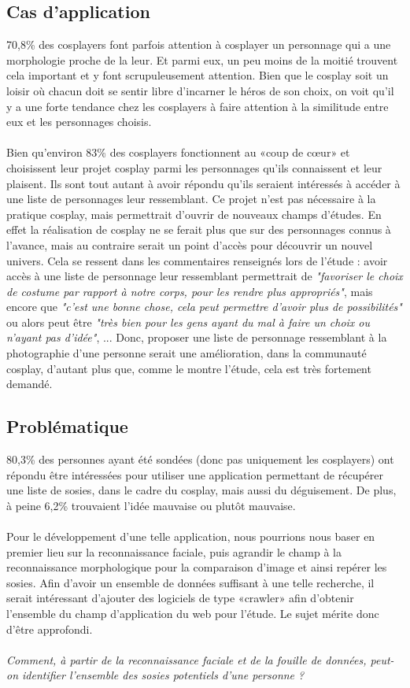 \documentclass[a4paper,12pt]{article}
\begin{document}
\subsection{Cas d'application}
70,8\% des cosplayers font parfois attention à cosplayer un personnage qui a une morphologie proche de la leur. Et parmi eux, un peu moins de la moitié trouvent cela important et y font scrupuleusement attention. Bien que le cosplay soit un loisir où chacun doit se sentir libre d'incarner le héros de son choix, on voit qu'il y a une forte tendance chez les cosplayers à faire attention à la similitude entre eux et les personnages choisis. 
\\ \\
Bien qu'environ 83\% des cosplayers fonctionnent au «coup de cœur» et choisissent leur projet cosplay parmi les personnages qu'ils connaissent et leur plaisent. Ils sont tout autant à avoir répondu qu'ils seraient intéressés à accéder à une liste de personnages leur ressemblant. Ce projet n'est pas nécessaire à la pratique cosplay, mais permettrait d'ouvrir de nouveaux champs d'études. En effet la réalisation de cosplay ne se ferait plus que sur des personnages connus à l'avance, mais au contraire serait un point d'accès pour découvrir un nouvel univers. Cela se ressent dans les commentaires renseignés lors de l'étude : avoir accès à une liste de personnage leur ressemblant permettrait de \textit{"favoriser le choix de costume par rapport à notre corps, pour les rendre plus appropriés"}, mais encore que \textit{"c'est une bonne chose, cela peut permettre d'avoir plus de possibilités"} ou alors peut être \textit{"très bien pour les gens ayant du mal à faire un choix ou n'ayant pas d'idée"}, ... Donc, proposer une liste de personnage ressemblant à la photographie d'une personne serait une amélioration, dans la communauté cosplay, d'autant plus que, comme le montre l'étude, cela est très fortement demandé.  

\subsection{Problématique}
80,3\% des personnes ayant été sondées (donc pas uniquement les cosplayers) ont répondu être intéressées pour utiliser une application permettant de récupérer une liste de sosies, dans le cadre du cosplay, mais aussi du déguisement. De plus, à peine 6,2\% trouvaient l'idée mauvaise ou plutôt mauvaise.  \\\\
Pour le développement d'une telle application, nous pourrions nous baser en premier lieu sur la reconnaissance faciale, puis agrandir le champ à la reconnaissance morphologique pour la comparaison d'image et ainsi repérer les sosies. 
Afin d'avoir un ensemble de données suffisant à une telle recherche, il serait intéressant d'ajouter des logiciels de type «crawler» afin d'obtenir l'ensemble du champ d'application du web pour l'étude.
Le sujet mérite donc d'être approfondi. \\\\
\textit{Comment, à partir de la reconnaissance faciale et de la fouille de données, peut-on identifier l'ensemble des sosies potentiels d'une personne ? }
\end{document}

